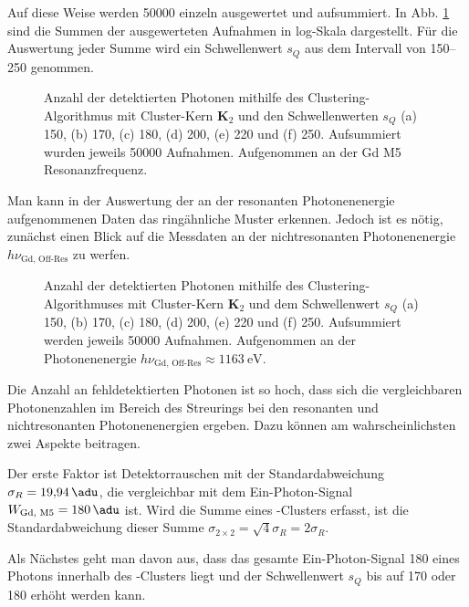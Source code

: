 \noindent
Auf diese Weise werden \SI{50000}{\captures} einzeln ausgewertet und aufsummiert. In Abb. \ref{fig:cl_2_150_170_180_200_220_250_resonance} sind die Summen der ausgewerteten Aufnahmen in log-Skala dargestellt. Für die Auswertung jeder Summe wird ein Schwellenwert $s_Q$ aus dem Intervall von \SIrange{150}{250}{\adu} genommen.
\begin{figure}[H]
    \centering
    
    \caption{Anzahl der detektierten Photonen mithilfe des Clustering-Algorithmus mit Cluster-Kern $\mathbf{K}_2$ und den Schwellenwerten $s_Q$ (a) \SI{150}{\adu}, (b) \SI{170}{\adu}, (c) \SI{180}{\adu}, (d) \SI{200}{\adu}, (e) \SI{220}{\adu} und (f) \SI{250}{\adu}. Aufsummiert wurden jeweils \num{50000} Aufnahmen. Aufgenommen an der Gd M5 Resonanzfrequenz.}
    \label{fig:cl_2_150_170_180_200_220_250_resonance}
\end{figure}
\noindent
Man kann in der Auswertung der an der resonanten Photonenenergie aufgenommenen Daten das ringähnliche Muster erkennen. Jedoch ist es nötig, zunächst einen Blick auf die Messdaten an der nichtresonanten Photonenenergie $h\nu_\text{Gd, Off-Res}$ zu werfen.
\begin{figure}[H]
    \centering
    
    \caption{Anzahl der detektierten Photonen mithilfe des Clustering-Algorithmuses mit Cluster-Kern $\mathbf{K}_2$ und dem Schwellenwert $s_Q$ (a) \SI{150}{\adu}, (b) \SI{170}{\adu}, (c) \SI{180}{\adu}, (d) \SI{200}{\adu}, (e) \SI{220}{\adu} und (f) \SI{250}{\adu}. Aufsummiert werden jeweils \num{50000} Aufnahmen. Aufgenommen an der Photonenenergie $h\nu_\text{Gd, Off-Res} \approx \SI{1163}{\eV}$.}
    \label{fig:cl_150_170_180_200_220_250_off_resonance}
\end{figure}
\noindent
Die Anzahl an fehldetektierten Photonen ist so hoch, dass sich die vergleichbaren Photonenzahlen im Bereich des Streurings bei den resonanten und nichtresonanten Photonenenergien ergeben. Dazu können am wahrscheinlichsten zwei Aspekte beitragen. 

\noindent
Der erste Faktor ist Detektorrauschen mit der Standardabweichung $\sigma_R = \SI{19.94}{\adu}$, die vergleichbar mit dem Ein-Photon-Signal $W_\text{Gd, M5} = \SI{180}{\adu}$ ist. Wird die Summe eines -Clusters erfasst, ist die Standardabweichung dieser Summe $\sigma_{2\times 2} = \sqrt{4}\sigma_R = 2\sigma_R$. 

\noindent
Als Nächstes geht man davon aus, dass das gesamte Ein-Photon-Signal \SI{180}{\adu} eines Photons innerhalb des -Clusters liegt und der Schwellenwert $s_Q$ bis auf \SI{170}{\adu} oder \SI{180}{\adu} erhöht werden kann.

